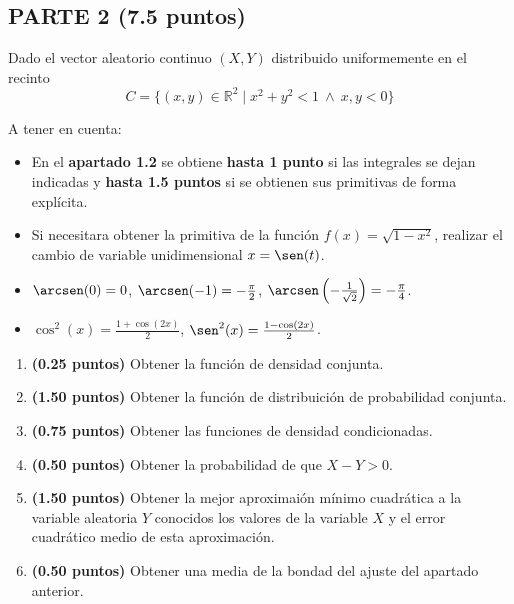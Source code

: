 \documentclass[12pt]{article}
\begin{document}
    \subsection*{PARTE 2 (7.5 puntos)}
    \setcounter{ejercicio}{0}
    \begin{ejercicio}[5 puntos]
        Dado el vector aleatorio continuo $(X,Y)$ distribuido uniformemente en el recinto
        \begin{equation*}
            C = \{(x,y)\in \mathbb{R}^2 \mid x^2+y^2 < 1 \ \land\ x,y < 0\}
        \end{equation*}

    \begin{observacion}
        A tener en cuenta:
        \begin{itemize}
            \item En el \textbf{apartado 1.2} se obtiene \textbf{hasta 1 punto} si las integrales se dejan indicadas y \textbf{hasta 1.5 puntos} si se obtienen sus primitivas de forma explícita.
            \item Si necesitara obtener la primitiva de la función $f(x) = \sqrt{1-x^2}$, realizar el cambio de variable unidimensional $x=\sen(t)$.
            \item $\arcsen(0)=0$, $\arcsen(-1)=-\frac{\pi}{2}$, $\arcsen\left(-\frac{1}{\sqrt{2}}\right) = -\frac{\pi}{4}$.
            \item $\cos^2(x) = \frac{1+\cos(2x)}{2}$, $\sen^2(x) = \frac{1-\cos(2x)}{2}$.
        \end{itemize}
    \end{observacion}
        \begin{enumerate}
            \item \textbf{(0.25 puntos)} Obtener la función de densidad conjunta.
            \item \textbf{(1.50 puntos)} Obtener la función de distribuición de probabilidad conjunta.
            \item \textbf{(0.75 puntos)} Obtener las funciones de densidad condicionadas.
            \item \textbf{(0.50 puntos)} Obtener la probabilidad de que $X-Y>0$.
            \item \textbf{(1.50 puntos)} Obtener la mejor aproximaión mínimo cuadrática a la variable aleatoria $Y$ conocidos los valores de la variable $X$ y el error cuadrático medio de esta aproximación.
            \item \textbf{(0.50 puntos)} Obtener una media de la bondad del ajuste del apartado anterior.
        \end{enumerate}
    \end{ejercicio}
\end{document}
